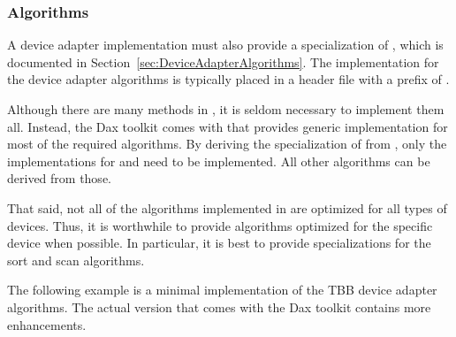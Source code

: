 
\subsubsection{Algorithms}


A device adapter implementation must also provide a specialization of
, which is documented in
Section~\ref{sec:DeviceAdapterAlgorithms}. The implementation for the
device adapter algorithms is typically placed in a header file with a
prefix of .

Although there are many methods in
, it is seldom necessary to
implement them all. Instead, the Dax toolkit comes with
 that provides generic
implementation for most of the required algorithms. By deriving the
specialization of  from
, only the implementations
for  and  need to be
implemented. All other algorithms can be derived from those.

That said, not all of the algorithms implemented in
 are optimized for all types
of devices. Thus, it is worthwhile to provide algorithms optimized for the
specific device when possible. In particular, it is best to provide
specializations for the sort and scan algorithms.

The following example is a minimal implementation of the TBB device adapter
algorithms. The actual version that comes with the Dax toolkit contains
more enhancements.

